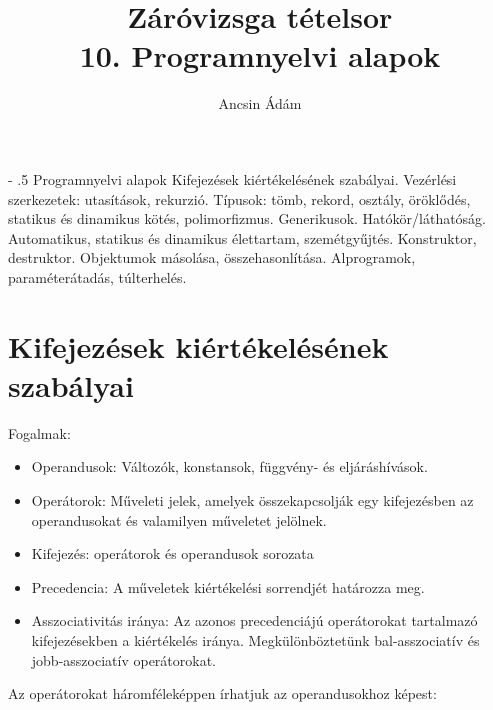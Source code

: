 \documentclass[margin=0px]{article}
\title{Záróvizsga tételsor \\ \large 10. Programnyelvi alapok}
\date{}
\author{Ancsin Ádám}
\makeatletter
\renewcommand\paragraph{%
	\@startsection{paragraph}{4}{0mm}%
	{-\baselineskip}%
	{.5\baselineskip}%
	{\normalfont\normalsize\bfseries}}
\newenvironment{tetel}[1]{\paragraph{#1}}{}
\makeatother
\begin{document}
	\maketitle
	
	\begin{tetel}{Programnyelvi alapok}
			Kifejezések kiértékelésének szabályai. Vezérlési szerkezetek: utasítások, rekurzió. Típusok: tömb, rekord, osztály, öröklődés, statikus és dinamikus kötés, polimorfizmus. Generikusok. Hatókör/láthatóság. Automatikus, statikus és dinamikus élettartam, szemétgyűjtés. Konstruktor, destruktor. Objektumok másolása, összehasonlítása. Alprogramok, paraméterátadás, túlterhelés.
	\end{tetel}
	
	\section{Kifejezések kiértékelésének szabályai}
	
	\noindent Fogalmak:
	\begin{itemize}
		\item	Operandusok: Változók, konstansok, függvény- és eljáráshívások.
		
		\item	Operátorok: Műveleti jelek, amelyek összekapcsolják egy kifejezésben az operandusokat és valamilyen
		műveletet jelölnek.
		
		\item	Kifejezés: operátorok és operandusok sorozata
		
		\item	Precedencia: A műveletek kiértékelési sorrendjét határozza meg.
		
		\item	Asszociativitás iránya: Az azonos precedenciájú operátorokat tartalmazó kifejezésekben a kiértékelés iránya.
		Megkülönböztetünk bal-asszociatív és jobb-asszociatív operátorokat.
	\end{itemize}
	
	\noindent Az operátorokat háromféleképpen írhatjuk az operandusokhoz képest:
	
\end{document}
